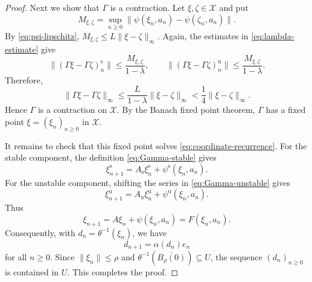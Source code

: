 \documentclass[10pt,a4paper]{amsart}
\begin{document}
\begin{proof}
Next we show that $\Gamma$ is a contraction. Let $\xi,\zeta\in\mathcal X$
and put
\[
M_{\xi,\zeta}
=
\sup_{n\geq 0}
\|\psi(\xi_n,a_n)-\psi(\zeta_n,a_n)\|.
\]
By \eqref{eq:psi-lipschitz},
$M_{\xi,\zeta}\leq L\|\xi-\zeta\|_\infty$. Again, the estimates in \eqref{eq:lambda-estimate} give
\[
\|(\Gamma\xi-\Gamma\zeta)_n^{\mathrm{s}}\|
\leq
\frac{M_{\xi,\zeta}}{1-\lambda},
\qquad
\|(\Gamma\xi-\Gamma\zeta)_n^{\mathrm{u}}\|
\leq
\frac{M_{\xi,\zeta}}{1-\lambda}.
\]
Therefore,
\[
\|\Gamma\xi-\Gamma\zeta\|_\infty
\leq
\frac{L}{1-\lambda}\|\xi-\zeta\|_\infty
<
\frac14\|\xi-\zeta\|_\infty.
\]
Hence $\Gamma$ is a contraction on $\mathcal X$. By the Banach fixed point
theorem, $\Gamma$ has a fixed point $\xi=(\xi_n)_{n\geq 0}$ in $\mathcal X$.

It remains to check that this fixed point solves
\eqref{eq:coordinate-recurrence}. For the stable component, the definition
\eqref{eq:Gamma-stable} gives
\[
\xi_{n+1}^{\mathrm{s}}
=
A_{\mathrm{s}}\xi_n^{\mathrm{s}}
+
\psi^{\mathrm{s}}(\xi_n,a_n).
\]
For the unstable component, shifting the series in
\eqref{eq:Gamma-unstable} gives
\[
\xi_{n+1}^{\mathrm{u}}
=
A_{\mathrm{u}}\xi_n^{\mathrm{u}}
+
\psi^{\mathrm{u}}(\xi_n,a_n).
\]
Thus
\[
\xi_{n+1}=A\xi_n+\psi(\xi_n,a_n)=F(\xi_n,a_n).
\]
Consequently, with $d_n=\theta^{-1}(\xi_n)$, we have
\[
d_{n+1}=\alpha(d_n)e_n
\]
for all $n\geq 0$. Since $\|\xi_n\|\leq\rho$ and
$\theta^{-1}(\overline{B_\rho(0)})\subseteq U$, the sequence
$(d_n)_{n\geq 0}$ is
contained in $U$. This completes the proof.
\end{proof}
\end{document}
